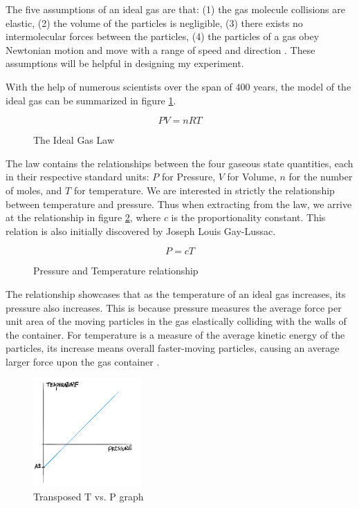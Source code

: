 \documentclass[a4paper,12pt]{article}
\begin{document}
The five assumptions of an ideal gas are that: (1) the gas molecule collisions are elastic, (2) the volume of the particles is negligible, (3) there exists no intermolecular forces between the particles, (4) the particles of a gas obey Newtonian motion and move with a range of speed and direction \parencite{gas_law}. These assumptions will be helpful in designing my experiment.

With the help of numerous scientists over the span of 400 years, the model of the ideal gas can be summarized in figure \ref{fig:igl}.

\begin{figure}[H]
    \[
    PV = nRT
    \]
    \caption{The Ideal Gas Law}
    \label{fig:igl}
\end{figure}

The law contains the relationships between the four gaseous state quantities, each in their respective standard units: $P$ for Pressure, $V$ for Volume, $n$ for the number of moles, and $T$ for temperature. We are interested in strictly the relationship between temperature and pressure. Thus when extracting from the law, we arrive at the relationship in figure \ref{fig:pt}, where $c$ is the proportionality constant. This relation is also initially discovered by Joseph Louis Gay-Lussac.

\begin{figure}[H]
    \[
    P = cT
    \]
    \caption{Pressure and Temperature relationship}
    \label{fig:pt}
\end{figure}

The relationship showcases that as the temperature of an ideal gas increases, its pressure also increases. This is because pressure measures the average force per unit area of the moving particles in the gas elastically colliding with the walls of the container. For temperature is a measure of the average kinetic energy of the particles, its increase means overall faster-moving particles, causing an average larger force upon the gas container \parencite{pearson}.



\begin{figure}
    \centering
    \includegraphics[width=0.37\textwidth]{assets/az.png}
    \caption{Transposed T vs. P graph}
    \label{fig:az}
\end{figure}
\end{document}
